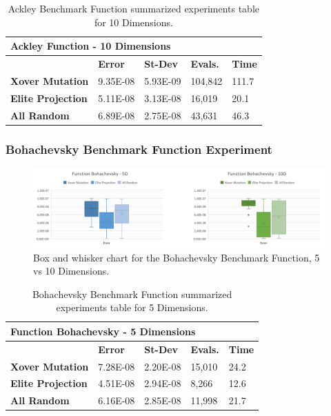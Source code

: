 \documentclass[graybox]{svmult}
\begin{document}
\begin{table}[]
    \scriptsize
    \centering
    \caption{Ackley Benchmark Function summarized experiments table for 10 Dimensions.}\label{tab.fun_ackley10}
    \begin{tabular}{@{}lllll@{}}
    \toprule
    \multicolumn{5}{l}{\textbf{Ackley Function - 10 Dimensions}} \\ \midrule
     & \textbf{Error} & \textbf{St-Dev} & \textbf{Evals.} & \textbf{Time} \\
    \textbf{Xover Mutation} & 9.35E-08 & 5.93E-09 & 104,842 & 111.7 \\
    \textbf{Elite Projection} & 5.11E-08 & 3.13E-08 & 16,019 & 20.1 \\
    \textbf{All Random} & 6.89E-08 & 2.75E-08 & 43,631 & 46.3 \\ \bottomrule
    \end{tabular}
    \end{table}


\subsubsection{Bohachevsky Benchmark Function Experiment}

\begin{figure}
    \includegraphics[width=\textwidth]{img/fig_fun_bohachevsky.pdf}
    \caption{Box and whisker chart for the Bohachevsky Benchmark Function, 5 vs 10 Dimensions.} \label{fig.fun_bohachevsky}
    \end{figure}

\begin{table}[]
    \scriptsize
    \centering
    \caption{Bohachevsky Benchmark Function summarized experiments table for 5 Dimensions.}\label{tab.fun_bohachevsky5}
    \begin{tabular}{@{}lllll@{}}
    \toprule
    \multicolumn{5}{l}{\textbf{Function Bohachevsky - 5 Dimensions}} \\ \midrule
     & \textbf{Error} & \textbf{St-Dev} & \textbf{Evals.} & \textbf{Time} \\
    \textbf{Xover Mutation} & 7.28E-08 & 2.20E-08 & 15,010 & 24.2 \\
    \textbf{Elite Projection} & 4.51E-08 & 2.94E-08 & 8,266 & 12.6 \\
    \textbf{All Random} & 6.16E-08 & 2.85E-08 & 11,998 & 21.7 \\ \bottomrule
    \end{tabular}
    \end{table}
\end{document}
